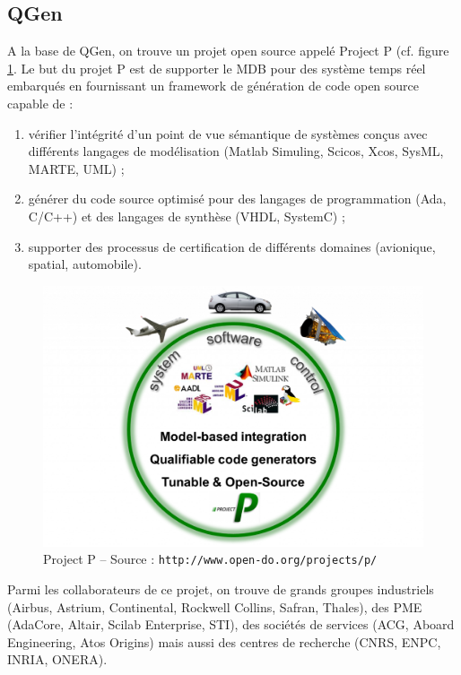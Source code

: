 \subsection{QGen}
A la base de QGen, on trouve un projet open source appelé
Project P (cf. figure \ref{fig:projectp}. Le but du projet P est de supporter le MDB pour des
système temps réel embarqués en fournissant un framework de génération de code
open source capable de :
\begin{enumerate}
  \item vérifier l'intégrité d'un point de vue sémantique de systèmes conçus avec
	différents langages de modélisation (Matlab\up{\circledR}
	Simuling\up{\circledR}, Scicos, Xcos, SysML, MARTE, UML) ;
  \item générer du code source optimisé pour des langages de programmation
	(Ada, C/C++) et des langages de synthèse (VHDL, SystemC) ;
  \item supporter des processus de certification de différents domaines
	(avionique, spatial, automobile).
\end{enumerate}

\begin{figure}[h]
  \centering
  \includegraphics[scale=0.3]{images/projectp}
  \caption{Project P -- Source : {\tt http://www.open-do.org/projects/p/}}
  \label{fig:projectp}
\end{figure}

Parmi les collaborateurs de ce projet, on trouve de grands groupes industriels
(Airbus, Astrium, Continental, Rockwell Collins, Safran, Thales), des PME
(AdaCore, Altair, Scilab Enterprise, STI), des sociétés de services (ACG, Aboard
Engineering, Atos Origins) mais aussi des centres de recherche (CNRS, ENPC,
INRIA, ONERA).\\

